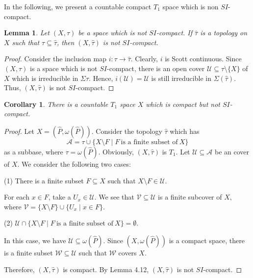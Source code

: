 \documentclass[preprint,12pt]{elsarticle}
\numberwithin{equation}{section}
\newtheorem{lemma}[theorem]{Lemma}
\newtheorem{corollary}[theorem]{Corollary}
\begin{document}
\quad In the following, we present a countable compact $T_{1}$ space which is non $SI$-compact.

\begin{lemma} Let $(X,\tau)$ be a space which is not $SI$-compact. If $\widehat{\tau}$ is a topology on $X$ such that $\tau\subseteq\widehat{\tau}$, then $(X,\widehat{\tau})$ is not $SI$-compact.
\end{lemma}

\begin{proof}Consider the inclusion map $i:\tau\longrightarrow\widehat{\tau}$. Clearly, $i$ is Scott continuous. Since $(X,\tau)$ is a space which is not $SI$-compact, there is an open cover $\mathcal{U}\subseteq \tau\setminus\{X\}$ of $X$ which is irreducible in $\Sigma \tau$. Hence, $i(\mathcal{U})=\mathcal{U}$ is still irreducible in $\Sigma(\hat{\tau})$. Thus, $(X,\widehat{\tau})$ is not $SI$-compact.\end{proof}

\begin{corollary} There is a countable $T_{1}$ space $X$ which is compact but not $SI$-compact.

\end{corollary}

\begin{proof}Let $X=(\widehat{P},\omega(\widehat{P}))$. Consider the topology $\widehat{\tau}$ which has $$\mathcal{A}=\tau\cup\{X\setminus F\mid F\ \mbox{is a finite subset of}\ X\}$$ as a subbase, where $\tau=\omega(\widehat{P})$. Obviously, $(X,\widehat{\tau})$ is $T_{1}$. Let $\mathcal{U}\subseteq\mathcal{A}$ be an cover of $X$. We consider the following two cases:

(1) There is a finite subset $F\subseteq X$ such that $X\setminus F\in\mathcal{U}$.

For each $x\in F$, take a $U_{x}\in\mathcal{U}$. We see that $\mathcal{V}\subseteq\mathcal{U}$ is a finite subcover of $X$, where $\mathcal{V}=\{X\setminus F\}\cup\{U_{x}\mid x\in F\}$.

(2) $\mathcal{U}\cap\{X\setminus F\mid F\ \mbox{is a finite subset of}\ X\}=\emptyset$.

In this case, we have $\mathcal{U}\subseteq\omega(\widehat{P})$. Since $(X,\omega(\widehat{P}))$ is  a compact space, there is a finite subset $\mathcal{W}\subseteq\mathcal{U}$ such that  $\mathcal{W}$ covers $X$.

Therefore, $(X,\widehat{\tau})$ is compact. By Lemma 4.12, $(X,\widehat{\tau})$ is not $SI$-compact.\end{proof}
\end{document}
